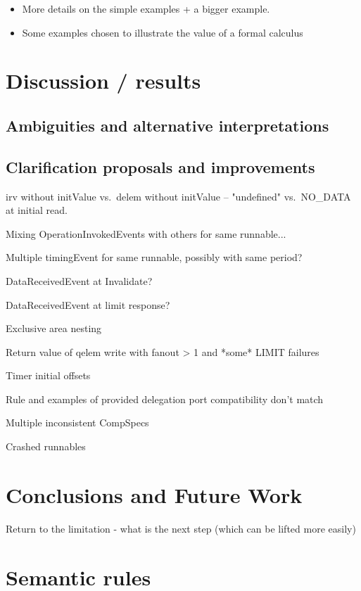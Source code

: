 \documentclass[twocolumn]{article}
\begin{document}
\begin{itemize}
\item More details on the simple examples + a bigger example.
\item Some examples chosen to illustrate the value of a formal calculus
\end{itemize}

\section{Discussion / results}
\label{sec:Disc}

\subsection{Ambiguities and alternative interpretations}
\label{sec:DiscAmb}

\subsection{Clarification proposals and improvements}
\label{sec:DiscImp}

irv without initValue vs.\ delem without initValue -- "undefined" vs.\ NO\_DATA at initial read.

Mixing OperationInvokedEvents with others for same runnable...

Multiple timingEvent for same runnable, possibly with same period?

DataReceivedEvent at Invalidate?

DataReceivedEvent at limit response?

Exclusive area nesting

Return value of qelem write with fanout > 1 and *some* LIMIT failures

Timer initial offsets

Rule and examples of provided delegation port compatibility don't match

Multiple inconsistent CompSpecs

Crashed runnables


\section{Conclusions and Future Work}
\label{sec:Conc}

Return to the limitation - what is the next step (which can be lifted more easily)

\onecolumn
\appendix
\section{Semantic rules}
\label{sec:Rules}
\end{document}

